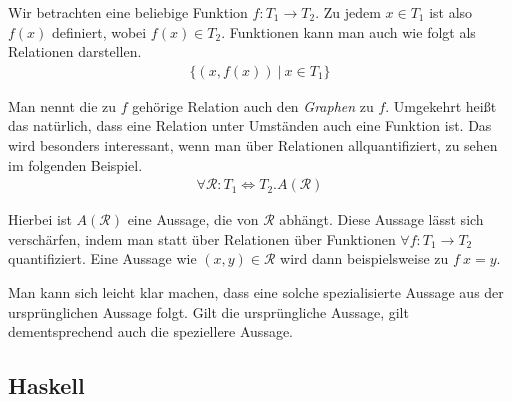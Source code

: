 Wir betrachten eine beliebige Funktion $f : T_1 \rightarrow T_2$. Zu jedem $x \in T_1$ ist also $f(x)$ definiert, wobei $f(x) \in T_2$. Funktionen kann man auch wie folgt als Relationen darstellen.
\begin{align*}
\{ (x, f(x)) ~|~ x \in T_1 \}
\end{align*}

Man nennt die zu $f$ gehörige Relation auch den \textit{Graphen} zu $f$.
Umgekehrt heißt das natürlich, dass eine Relation unter Umständen auch eine Funktion ist. Das wird besonders interessant, wenn man
über Relationen allquantifiziert, zu sehen im folgenden Beispiel.
\begin{align*}
\forall \mathcal{R} : T_1 \Leftrightarrow T_2 . A(\mathcal{R})
\end{align*}

Hierbei ist $A(\mathcal{R})$ eine Aussage, die von $\mathcal{R}$ abhängt.
Diese Aussage lässt sich verschärfen, indem man statt über Relationen über Funktionen $\forall f : T_1 \rightarrow T_2$ quantifiziert.
Eine Aussage wie  $(x, y) \in \mathcal{R}$ wird dann beispielsweise zu $f\ x = y$.

Man kann sich leicht klar machen, dass eine solche spezialisierte Aussage aus der ursprünglichen Aussage folgt. Gilt die ursprüngliche
Aussage, gilt dementsprechend auch die speziellere Aussage.

%
%


\subsection{Haskell}


